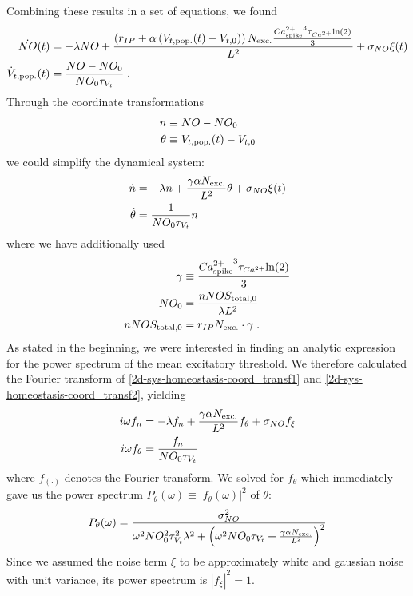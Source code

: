 \documentclass[10pt,a4paper]{article}
\begin{document}
Combining these results in a set of equations, we found
\begin{align}
\dot{NO}(t) &= -\lambda NO + \frac{ \left( r_{IP} + \alpha \left( V_{t,\rm pop.}(t)-V_{t,0} \right) \right)  N_{\rm exc.}\frac{{Ca^{2+}_{\rm spike}}^3 \tau_{Ca^{2+}} \mathrm{ln} (2)}{3}}{L^2} + \sigma_{NO} \xi(t) \label{2d-sys-homeostasis1}\\
\dot{V}_{t,\rm pop.}(t) &= \frac{NO-NO_0}{NO_0 \tau_{V_t}}\;. \label{2d-sys-homeostasis2}
\end{align}
Through the coordinate transformations
\begin{align}
n &\equiv NO-NO_0 \label{simplif_coord_transf1}\\
\theta &\equiv V_{t,\rm pop.}(t)-V_{t,0} \label{simplif_coord_transf2}\\
\end{align}
we could simplify the dynamical system:
\begin{align}
\dot{n} &= -\lambda n + \frac{\gamma \alpha N_{\rm exc.}}{L^2}\theta + \sigma_{NO} \xi(t) \label{2d-sys-homeostasis-coord_transf1}\\
\dot{\theta} &= \frac{1}{NO_0 \tau_{V_t}} n \label{2d-sys-homeostasis-coord_transf2}
\end{align}
where we have additionally used
\begin{align}
\gamma &\equiv \frac{{Ca^{2+}_{\rm spike}}^3 \tau_{Ca^{2+}} \mathrm{ln} (2)}{3} \label{2d-sys-fixed-points1}\\
NO_0 &= \frac{nNOS_{\mathrm{ total},0}}{\lambda L^2} \label{2d-sys-fixed-points2}\\
nNOS_{\mathrm{ total},0} &= r_{IP} N_{\rm exc.} \cdot \gamma \; . \label{2d-sys-fixed-points3}
\end{align}
As stated in the beginning, we were interested in finding an analytic expression for the power spectrum of the mean excitatory threshold. We therefore calculated the Fourier transform of \eqref{2d-sys-homeostasis-coord_transf1} and \eqref{2d-sys-homeostasis-coord_transf2}, yielding
\begin{align}
i\omega f_n &= - \lambda f_n + \frac{\gamma \alpha N_{\rm exc.}}{L^2}f_\theta + \sigma_{NO} f_{\xi} \label{2d-sys-homeostasis-coord_transf_ft1}\\
i\omega f_\theta &= \frac{f_n}{NO_0\tau_{V_t}} \label{2d-sys-homeostasis-coord_transf_ft2} \\
\end{align}
where $f_{(\cdot)}$ denotes the Fourier transform. We solved for $f_\theta$ which immediately gave us the power spectrum $P_\theta (\omega) \equiv |f_\theta (\omega)|^2$ of $\theta$:
\begin{equation}
P_\theta (\omega) = \frac{\sigma_{NO}^2}{\omega^2 NO_0^2 \tau_{V_t}^2 \lambda^2 + \left( \omega^2 NO_0 \tau_{V_t} + \frac{\gamma \alpha N_{\rm exc.}}{L^2}\right)^2} \label{Pow_Spec_Theta_Final}
\end{equation}
Since we assumed the noise term $\xi$ to be approximately white and gaussian noise with unit variance, its power spectrum is $|f_{\xi}|^2 = 1$.
\end{document}
